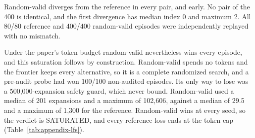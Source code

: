 Random-valid diverges from the reference in every pair, and early. No pair of the 400 is identical, and the first divergence has median index 0 and maximum 2. All 80/80 reference and 400/400 random-valid episodes were independently replayed with no mismatch.

Under the paper's token budget random-valid nevertheless wins every episode, and this saturation follows by construction. Random-valid spends no tokens and the frontier keeps every alternative, so it is a complete randomized search, and a pre-audit probe had won 100/100 non-audited episodes. Its only way to lose was a 500,000-expansion safety guard, which never bound. Random-valid used a median of 201 expansions and a maximum of 102,606, against a median of 29.5 and a maximum of 1,300 for the reference. Random-valid wins at every seed, so the verdict is SATURATED, and every reference loss ends at the token cap (Table~\ref{tab:appendix-lfs}).

